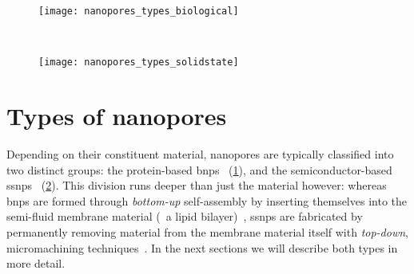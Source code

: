 %
\begin{figure*}[b]
  \centering
  \medskip
  \begin{subfigure}[b]{115mm}
    \centering
    \caption{}\vspace{-2.5mm}\label{fig:nanopores_types_biological}
    \texttt{[image: nanopores\_types\_biological]}
  \end{subfigure}
  \\ \vspace{-1mm}
  \begin{subfigure}[b]{115mm}
    \centering
    \caption{}\vspace{-2.5mm}\label{fig:nanopores_types_solidstate}
    \texttt{[image: nanopores\_types\_solidstate]}
  \end{subfigure}
%
\caption[Types of nanopores.]{%
  \textbf{Types of nanopores.}
  Cross-sectional (left) and top (right) views for a fully atomistic representation of 
  ()
  a Cytolysin A (ClyA) biological nanopore (orange) embedded in a lipid bilayer (green), and
  ()
  a double-conical solid-state nanopore drilled through a \SI{7}{\nm}-thick  membrane (green and
  gray spheres).
  Both pores are surrounded by a \SI{0.15}{\Molar} electrolyte solution containing cations (blue spheres),
  anions (red spheres) and water molecules (light blue spheres). Note that for clarity, only the water
  molecules behind the pore are shown, represented by their oxygen atom.
  Molecular structures were prepared and rendered using \gls{namd}~\cite{Phillips-2005} and
  \gls{vmd}~\cite{Humphrey-1996,Stone-1998}.
  }\label{fig:nanopores_types}
\end{figure*}
%


%
%
\section{Types of nanopores}
%
\label{sec:np:types}
%

Depending on their constituent material, nanopores are typically classified into two distinct groups: the
protein-based \glspl{bnp}~\cite{Willems-VanMeervelt-2017} (\cref{fig:nanopores_types_biological}), and the
semiconductor-based \glspl{ssnp}~\cite{Dekker-2007} (\cref{fig:nanopores_types_solidstate}). This division
runs deeper than just the material however: whereas \glspl{bnp} are formed through \emph{bottom-up}
self-assembly by inserting themselves into the semi-fluid membrane material (\eg~a lipid
bilayer)~\cite{Howorka-2017}, \glspl{ssnp} are fabricated by permanently removing material from the membrane
material itself with \emph{top-down}, micromachining techniques~\cite{Dekker-2007}. In the next sections we
will describe both types in more detail.


